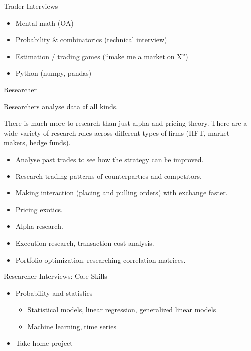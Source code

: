 \begin{frame}{Trader Interviews}
  \begin{itemize}
    \item Mental math (OA)
    \item Probability \& combinatorics (technical interview)
    \item Estimation / trading games (``make me a market on X'')
    \item Python (numpy, pandas)
  \end{itemize}
\end{frame}

\begin{frame}{Researcher}
  \begin{sqt:definition}
    Researchers analyse data of all kinds.
  \end{sqt:definition}

  There is much more to research than just alpha and pricing theory.
  There are a wide variety of research roles across different types of firms (HFT, market makers, hedge funds).

  \begin{itemize}
    \item Analyse past trades to see how the strategy can be improved.
    \item Research trading patterns of counterparties and competitors.
    \item Making interaction (placing and pulling orders) with exchange faster.
    \item Pricing exotics.
    \item Alpha research.
    \item Execution research, transaction cost analysis.
    \item Portfolio optimization, researching correlation matrices.
  \end{itemize}
\end{frame}

\begin{frame}{Researcher Interviews: Core Skills}
  \begin{itemize}
    \item Probability and statistics
    \begin{itemize}
      \item Statistical models, linear regression, generalized linear models
      \item Machine learning, time series
    \end{itemize}
    \item Take home project
  \end{itemize}
\end{frame}

